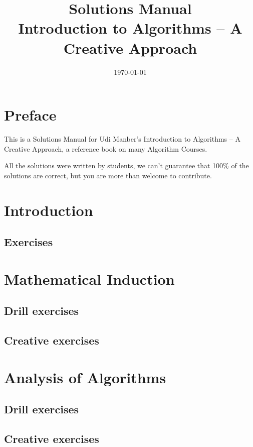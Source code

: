 \documentclass[a4paper,11pt]{memoir}
\title{{\huge \textbf{Solutions Manual}}\\Introduction to Algorithms -- A Creative
Approach}
\author{}
\date{\today}
\begin{document}
    \frontmatter 
   
    \maketitle
    \chapter{Preface}
    This is a Solutions Manual for Udi Manber's Introduction to Algorithms -- A
    Creative Approach, a reference book on many Algorithm Courses.

    All the solutions were written by students, we can't guarantee that 100\% of
    the solutions are correct, but you are more than welcome to contribute.

    \newpage 
    \tableofcontents

    \mainmatter
    \chapter{Introduction}
    \section{Exercises}

    \chapter{Mathematical Induction}
    \section{Drill exercises}
    \section{Creative exercises}

    \chapter{Analysis of Algorithms}
    \section{Drill exercises}
    \section{Creative exercises}
    
\end{document}
